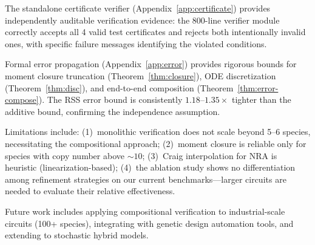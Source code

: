 \documentclass[11pt]{article}
\begin{document}
The standalone certificate verifier (Appendix~\ref{app:certificate})
provides independently auditable verification evidence: the 800-line
verifier module correctly accepts all 4 valid test certificates and
rejects both intentionally invalid ones, with specific failure
messages identifying the violated conditions.

Formal error propagation (Appendix~\ref{app:error}) provides
rigorous bounds for moment closure truncation
(Theorem~\ref{thm:closure}), ODE discretization
(Theorem~\ref{thm:disc}), and end-to-end composition
(Theorem~\ref{thm:error-compose}). The RSS error bound is
consistently $1.18$--$1.35\times$ tighter than the additive bound,
confirming the independence assumption.

Limitations include: (1)~monolithic verification does not scale
beyond 5--6 species, necessitating the compositional approach;
(2)~moment closure is reliable only for species with copy number
above ${\sim}10$;
(3)~Craig interpolation for NRA is heuristic (linearization-based);
(4)~the ablation study shows no differentiation among refinement
strategies on our current benchmarks---larger circuits are needed to
evaluate their relative effectiveness.

Future work includes applying compositional verification to
industrial-scale circuits (100+ species), integrating with genetic
design automation tools, and extending to stochastic hybrid models.

\end{document}
